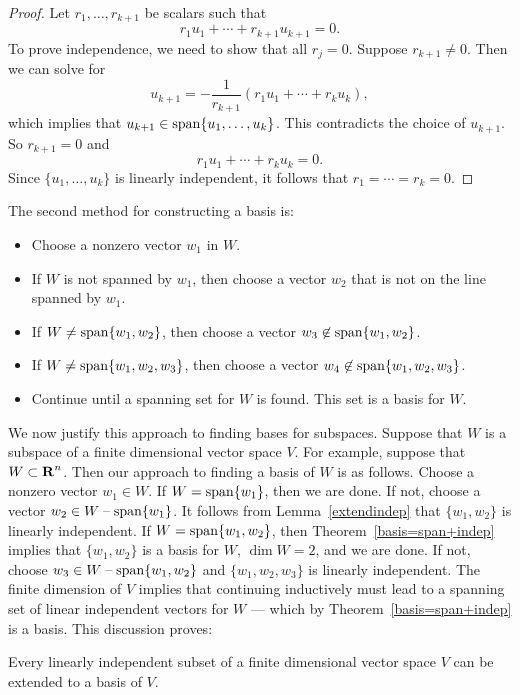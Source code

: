 \documentclass{ximera}
\begin{document}
\begin{proof}  Let $r_1,\ldots,r_{k+1}$ be scalars such that
\begin{equation}  \label{rk+1}
r_1u_1 + \cdots + r_{k+1}u_{k+1} = 0.
\end{equation}
To prove independence, we need to show that all $r_j=0$.
Suppose $r_{k+1}\neq 0$.  Then we can solve  for
\[
u_{k+1} = -\frac{1}{r_{k+1}}(r_1u_1+\cdots +r_ku_k),
\]
which implies that $u_{k+1}\in {\rm span}\{u_1,\ldots,u_k\}$.  This
contradicts the choice of $u_{k+1}$.  So $r_{k+1}=0$ and
\[
r_1u_1 + \cdots + r_ku_k = 0.
\]
Since $\{u_1,\ldots,u_k\}$ is linearly independent, it follows
that $r_1=\cdots =r_k=0$.  \end{proof}

The second method for constructing a basis is:
\begin{itemize}
\item        Choose a nonzero vector $w_1$ in $W$.
\item If $W$ is not spanned by $w_1$, then choose a vector $w_2$
that is not on the line spanned by $w_1$.
\item        If $W\neq{\rm span}\{w_1,w_2\}$, then choose a vector
$w_3\not\in
{\rm span}\{w_1,w_2\}$.
\item        If $W\neq{\rm span}\{w_1,w_2,w_3\}$, then choose a vector
$w_4\not\in
{\rm span}\{w_1,w_2,w_3\}$.
\item Continue until a spanning set for $W$ is
found.  This set is a basis for $W$.
\end{itemize}

We now justify this approach to finding bases for subspaces.
Suppose that $W$ is a subspace of a finite dimensional vector
space $V$.  For example, suppose that $W\subset\mbox{$\bf{R}$}^n$. Then
our approach to finding a basis of $W$ is as follows.  Choose a
nonzero vector $w_1\in W$.  If $W={\rm span}\{w_1\}$, then we are
done.  If not, choose a vector $w_2\in W\;\mbox{--}\;{\rm span}\{w_1\}$.
It follows from Lemma~\ref{extendindep} that $\{w_1,w_2\}$ is
linearly independent.  If $W={\rm span}\{w_1,w_2\}$, then
Theorem~\ref{basis=span+indep} implies that $\{w_1,w_2\}$ is
a basis for $W$, $\dim W=2$, and we are done.  If not, choose
$w_3\in W\;\mbox{--}\;{\rm span}\{w_1,w_2\}$ and $\{w_1,w_2,w_3\}$ is
linearly independent.  The finite dimension of $V$ implies that
continuing inductively must lead to a spanning set of linear
independent vectors for $W$ --- which by
Theorem~\ref{basis=span+indep} is a basis. This discussion proves:
\begin{cor}  \label{c:extendindependent}
Every linearly independent subset of a finite dimensional vector
space $V$ can be extended to a basis of $V$.
\end{cor}
\end{document}
